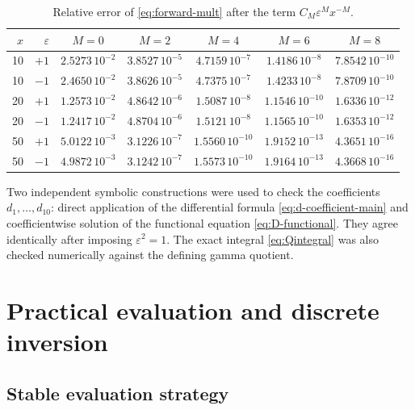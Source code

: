\documentclass[11pt]{article}
\theoremstyle{definition}
\theoremstyle{remark}
\newcommand{\eps}{\varepsilon}
\begin{document}
\begin{table}[htbp]
\centering
\caption{Relative error of \eqref{eq:forward-mult} after the term $C_M\eps^Mx^{-M}$.}
\label{tab:forward-errors}
\small
\begin{tabular}{@{}rrccccc@{}}
\toprule
$x$ & $\eps$ & $M=0$ & $M=2$ & $M=4$ & $M=6$ & $M=8$\\
\midrule
10 & $+1$ & $2.5273\,10^{-2}$ & $3.8527\,10^{-5}$ & $4.7159\,10^{-7}$ & $1.4186\,10^{-8}$ & $7.8542\,10^{-10}$\\
10 & $-1$ & $2.4650\,10^{-2}$ & $3.8626\,10^{-5}$ & $4.7375\,10^{-7}$ & $1.4233\,10^{-8}$ & $7.8709\,10^{-10}$\\
20 & $+1$ & $1.2573\,10^{-2}$ & $4.8642\,10^{-6}$ & $1.5087\,10^{-8}$ & $1.1546\,10^{-10}$ & $1.6336\,10^{-12}$\\
20 & $-1$ & $1.2417\,10^{-2}$ & $4.8704\,10^{-6}$ & $1.5121\,10^{-8}$ & $1.1565\,10^{-10}$ & $1.6353\,10^{-12}$\\
50 & $+1$ & $5.0122\,10^{-3}$ & $3.1226\,10^{-7}$ & $1.5560\,10^{-10}$ & $1.9152\,10^{-13}$ & $4.3651\,10^{-16}$\\
50 & $-1$ & $4.9872\,10^{-3}$ & $3.1242\,10^{-7}$ & $1.5573\,10^{-10}$ & $1.9164\,10^{-13}$ & $4.3668\,10^{-16}$\\
\bottomrule
\end{tabular}
\end{table}

Two independent symbolic constructions were used to check the coefficients $d_1,\ldots,d_{10}$: direct application of the differential formula \eqref{eq:d-coefficient-main} and coefficientwise solution of the functional equation \eqref{eq:D-functional}.  They agree identically after imposing $\eps^2=1$.  The exact integral \eqref{eq:Qintegral} was also checked numerically against the defining gamma quotient.

\section{Practical evaluation and discrete inversion}

\subsection{Stable evaluation strategy}
\end{document}
